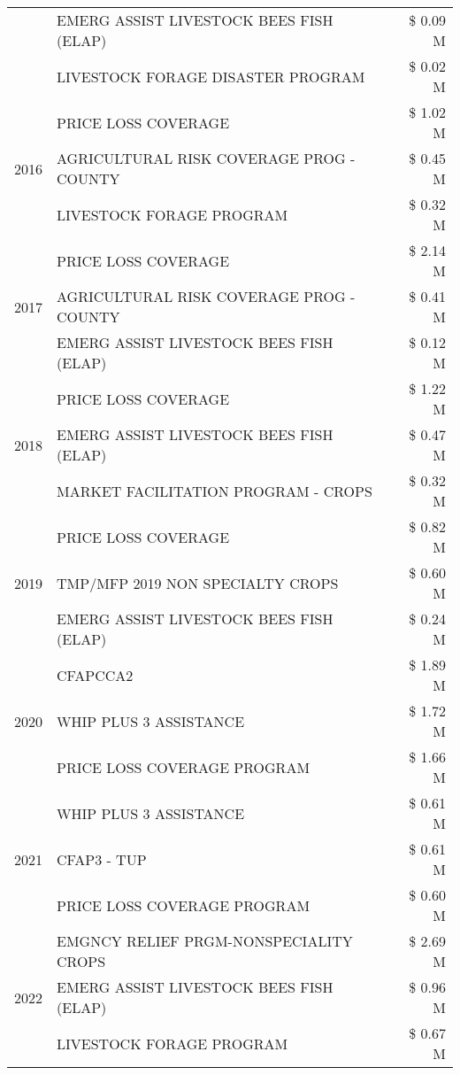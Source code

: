 \begin{tabular}{llr}
 & EMERG ASSIST LIVESTOCK BEES FISH (ELAP) & \$ 0.09 M \\
 & LIVESTOCK FORAGE DISASTER PROGRAM & \$ 0.02 M \\
\cline{1-3}
\multirow[t]{3}{*}{2016} & PRICE LOSS COVERAGE & \$ 1.02 M \\
 & AGRICULTURAL RISK COVERAGE PROG - COUNTY & \$ 0.45 M \\
 & LIVESTOCK FORAGE PROGRAM & \$ 0.32 M \\
\cline{1-3}
\multirow[t]{3}{*}{2017} & PRICE LOSS COVERAGE & \$ 2.14 M \\
 & AGRICULTURAL RISK COVERAGE PROG - COUNTY & \$ 0.41 M \\
 & EMERG ASSIST LIVESTOCK BEES FISH (ELAP) & \$ 0.12 M \\
\cline{1-3}
\multirow[t]{3}{*}{2018} & PRICE LOSS COVERAGE & \$ 1.22 M \\
 & EMERG ASSIST LIVESTOCK BEES FISH (ELAP) & \$ 0.47 M \\
 & MARKET FACILITATION PROGRAM - CROPS & \$ 0.32 M \\
\cline{1-3}
\multirow[t]{3}{*}{2019} & PRICE LOSS COVERAGE & \$ 0.82 M \\
 & TMP/MFP 2019 NON SPECIALTY CROPS & \$ 0.60 M \\
 & EMERG ASSIST LIVESTOCK BEES FISH (ELAP) & \$ 0.24 M \\
\cline{1-3}
\multirow[t]{3}{*}{2020} & CFAPCCA2 & \$ 1.89 M \\
 & WHIP PLUS 3 ASSISTANCE & \$ 1.72 M \\
 & PRICE LOSS COVERAGE PROGRAM & \$ 1.66 M \\
\cline{1-3}
\multirow[t]{3}{*}{2021} & WHIP PLUS 3 ASSISTANCE & \$ 0.61 M \\
 & CFAP3 - TUP & \$ 0.61 M \\
 & PRICE LOSS COVERAGE PROGRAM & \$ 0.60 M \\
\cline{1-3}
\multirow[t]{3}{*}{2022} & EMGNCY RELIEF PRGM-NONSPECIALITY CROPS & \$ 2.69 M \\
 & EMERG ASSIST LIVESTOCK BEES FISH (ELAP) & \$ 0.96 M \\
 & LIVESTOCK FORAGE PROGRAM & \$ 0.67 M \\
\cline{1-3}
\bottomrule
\end{tabular}
